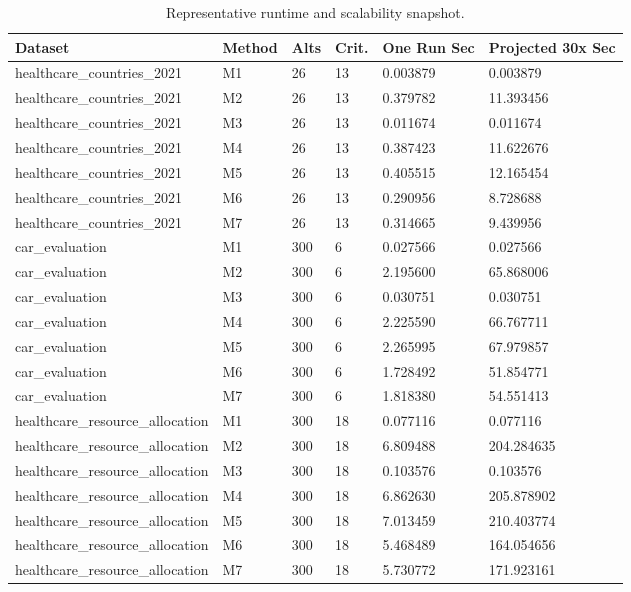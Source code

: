 \begin{table}[htbp]
\centering
\small
\caption{Representative runtime and scalability snapshot.}
\label{tab:runtime_scalability}
\begin{tabular}{llllll}
\hline
Dataset & Method & Alts & Crit. & One Run Sec & Projected 30x Sec \\
\hline
healthcare\_countries\_2021 & M1 & 26 & 13 & 0.003879 & 0.003879 \\
healthcare\_countries\_2021 & M2 & 26 & 13 & 0.379782 & 11.393456 \\
healthcare\_countries\_2021 & M3 & 26 & 13 & 0.011674 & 0.011674 \\
healthcare\_countries\_2021 & M4 & 26 & 13 & 0.387423 & 11.622676 \\
healthcare\_countries\_2021 & M5 & 26 & 13 & 0.405515 & 12.165454 \\
healthcare\_countries\_2021 & M6 & 26 & 13 & 0.290956 & 8.728688 \\
healthcare\_countries\_2021 & M7 & 26 & 13 & 0.314665 & 9.439956 \\
car\_evaluation & M1 & 300 & 6 & 0.027566 & 0.027566 \\
car\_evaluation & M2 & 300 & 6 & 2.195600 & 65.868006 \\
car\_evaluation & M3 & 300 & 6 & 0.030751 & 0.030751 \\
car\_evaluation & M4 & 300 & 6 & 2.225590 & 66.767711 \\
car\_evaluation & M5 & 300 & 6 & 2.265995 & 67.979857 \\
car\_evaluation & M6 & 300 & 6 & 1.728492 & 51.854771 \\
car\_evaluation & M7 & 300 & 6 & 1.818380 & 54.551413 \\
healthcare\_resource\_allocation & M1 & 300 & 18 & 0.077116 & 0.077116 \\
healthcare\_resource\_allocation & M2 & 300 & 18 & 6.809488 & 204.284635 \\
healthcare\_resource\_allocation & M3 & 300 & 18 & 0.103576 & 0.103576 \\
healthcare\_resource\_allocation & M4 & 300 & 18 & 6.862630 & 205.878902 \\
healthcare\_resource\_allocation & M5 & 300 & 18 & 7.013459 & 210.403774 \\
healthcare\_resource\_allocation & M6 & 300 & 18 & 5.468489 & 164.054656 \\
healthcare\_resource\_allocation & M7 & 300 & 18 & 5.730772 & 171.923161 \\
\hline
\end{tabular}
\end{table}
